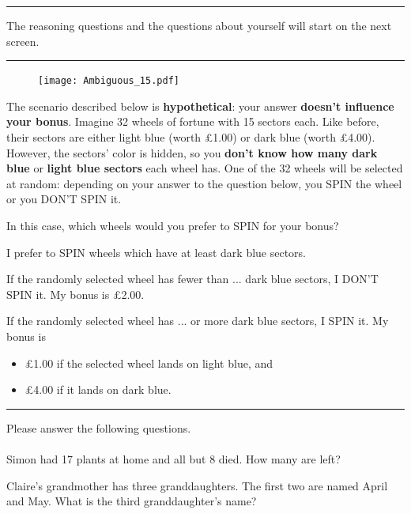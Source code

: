\noindent \rule{\linewidth}{0.4pt}

\newpage
The reasoning questions and the questions about yourself will start on the next screen.

\smallskip
\noindent \rule{\linewidth}{0.4pt}

\begin{figure}[h!]
	\centering
	{\texttt{[image: Ambiguous\_15.pdf]}}
\end{figure}

\noindent The scenario described below is \textbf{hypothetical}: your answer \textbf{doesn't influence your bonus}.
\smallskip
\noindent Imagine 32 wheels of fortune with 15 sectors each.
Like before, their sectors are either light blue (worth £1.00) or dark blue (worth £4.00).
However, the sectors' color is hidden, so you \textbf{don't know how many dark blue} or \textbf{light blue sectors} each wheel has.
One of the 32 wheels will be selected at random: depending on your answer to the question below, you SPIN the wheel or you DON'T SPIN it.
 
\noindent In this case, which wheels would you prefer to SPIN for your bonus?


\smallskip
\noindent I prefer to SPIN wheels which have at least \framebox[0.1\textwidth]{\rule{0pt}{15pt}} dark blue sectors.

\smallskip
\noindent If the randomly selected wheel has fewer than ... dark blue sectors, I DON'T SPIN it.
My bonus is £2.00.

\noindent If the randomly selected wheel has ... or more dark blue sectors, I SPIN it.
My bonus is
\begin{itemize}
\item £1.00 if the selected wheel lands on light blue, and
\item £4.00 if it lands on dark blue.
\end{itemize}

\noindent \rule{\linewidth}{0.4pt}

\newpage
\noindent Please answer the following questions.\\
\\
\noindent Simon had 17 plants at home and all but 8 died.
How many are left?\\
\framebox[0.1\textwidth]{\rule{0pt}{15pt}}

\noindent Claire's grandmother has three granddaughters.
The first two are named April and May.
What is the third granddaughter's name?\\
\framebox[0.1\textwidth]{\rule{0pt}{15pt}}

